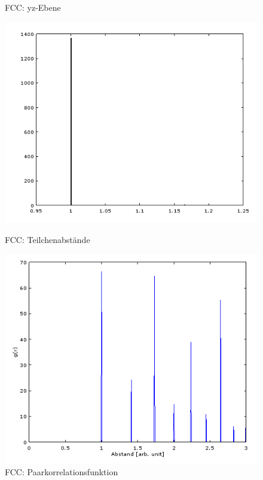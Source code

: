 \begin{figure}[H]
\begin{minipage}[b]{0.3\textwidth}
    \caption{FCC: yz-Ebene}
    \label{fig:fccyz}
\end{minipage} 
\end{figure}

\begin{figure}[H]
\begin{minipage}[b]{0.5\textwidth}
    \centering
    \includegraphics[scale=0.5]{data/fcc-hist.PNG}
    \caption{FCC: Teilchenabstände}
    \label{fig:fccabstand}
\end{minipage}    
\begin{minipage}[b]{0.5\textwidth}
    \centering
    \includegraphics[scale=0.5]{data/fcc-paircorrelation.PNG}
    \caption{FCC: Paarkorrelationsfunktion}
    \label{fig:fccg}
\end{minipage} 
\end{figure}

